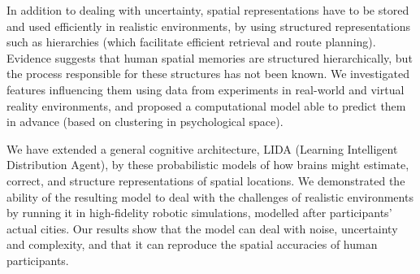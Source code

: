 {%

In addition to dealing with uncertainty, spatial representations have to be stored and used efficiently in realistic environments, by using structured representations such as hierarchies (which facilitate efficient retrieval and route planning). Evidence suggests that human spatial memories are structured hierarchically, but the process responsible for these structures has not been known. We investigated features influencing them using data from experiments in real-world and virtual reality environments, and proposed a computational model able to predict them in advance (based on clustering in psychological space).



We have extended a general cognitive architecture, LIDA (Learning Intelligent Distribution Agent), by these probabilistic models of how brains might estimate, correct, and structure representations of spatial locations. We demonstrated the ability of the resulting model to deal with the challenges of realistic environments by running it in high-fidelity robotic simulations, modelled after participants' actual cities. Our results show that the model can deal with noise, uncertainty and complexity, and that it can reproduce the spatial accuracies of human participants. 

}
